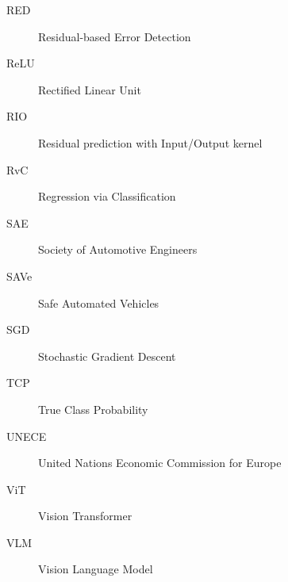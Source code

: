 \begin{description}
	\item[RED] Residual-based Error Detection
	\item[ReLU] Rectified Linear Unit
	\item[RIO] Residual prediction with Input/Output kernel
	\item[RvC] Regression via Classification
	\item[SAE] Society of Automotive Engineers
	\item[SAVe] Safe Automated Vehicles
	\item[SGD] Stochastic Gradient Descent
	\item[TCP] True Class Probability
	\item[UNECE] United Nations Economic Commission for Europe
	\item[ViT] Vision Transformer
	\item[VLM] Vision Language Model
\end{description}

